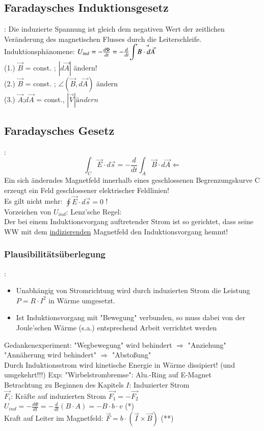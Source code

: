	\subsection{Faradaysches Induktionsgesetz}:
	Die induzierte Spannung ist gleich dem negativen Wert der zeitlichen Veränderung des magnetischen Flusses durch die Leiterschleife.\hfill\break
	Induktionsphänomene: $ U_{ind} = -\frac{d\Phi}{dt} = - \frac{d}{dt} {\displaystyle \int} \vec{B \cdot d \vec{A} } $ \\
	(1.) $ \vec{B} $ = const. ; $ |d\vec{A}| $ ändern! \\
	(2.) $ \vec{B} $ = const. ; $ \angle (\vec{B},d\vec{A})$ ändern\\
	(3.) $ \vec{A} $;$ d\vec{A} $ = const., $ |\vec{V}| ändern $\\
	
	\subsection{Faradaysches Gesetz}:
	\bild
	$$ \int_C \vec{E} \cdot d\vec{s} = - \frac{d}{dt} \int_A \vec{B} \cdot d \vec{A} \Leftarrow $$
	Ein sich änderndes Magnetfeld innerhalb eines geschlossenen Begrenzungskurve C erzeugt ein Feld geschlossener elektrischer Feldlinien! \\
	Es gilt nicht mehr: $ \oint \vec{E} \cdot d\vec{s} = 0 $ !\\
	Vorzeichen von $ U_{ind} $: Lenz'sche Regel:\\
	Der bei einem Induktionsvorgang auftretender Strom ist so gerichtet, dass seine WW mit dem \underline{indizierenden} Magnetfeld den Induktionsvorgang hemmt!
	
	\subsubsection{Plausibilitätsüberlegung}:\\
	\begin{itemize}
		\item Unabhängig von Stromrichtung wird durch induzierten Strom die Leistung $ P = R \cdot I^2 $ in Wärme umgesetzt.
		\item Ist Induktionsvorgang mit "Bewegung" verbunden, so muss dabei von der Joule'schen Wärme (s.a.) entsprechend Arbeit verrichtet werden
	\end{itemize}
	Gedankenexperiment:
	\bild
	"Wegbewegung" wird behindert $ \Rightarrow $ "Anziehung"
	\bild
	"Annäherung wird behindert" $ \Rightarrow $ "Abstoßung"\\
	Durch Induktionsstrom wird kinetische Energie in Wärme dissipiert! (und umgekehrt!!!)
	Exp: "Wirbelstrombremse": Alu.-Ring auf E-Magnet\\
	Betrachtung zu Beginnen des Kapitels
	\bild
	$ I $: Induzierter Strom \\
	$ \vec{F_i} $: Kräfte auf induzierten Strom \hspace{5mm} $ \vec{F_1} = - \vec{F_2} $\\
	$ U_{ind} = - \frac{d\Phi}{dt} = -\frac{d}{dt} (B\cdot A) = -B \cdot b \cdot v $ (*) \\
	Kraft auf Leiter im Magnetfeld: $ \vec{F} = b \cdot (\vec{I}\times\vec{B}) $ (**)\\
